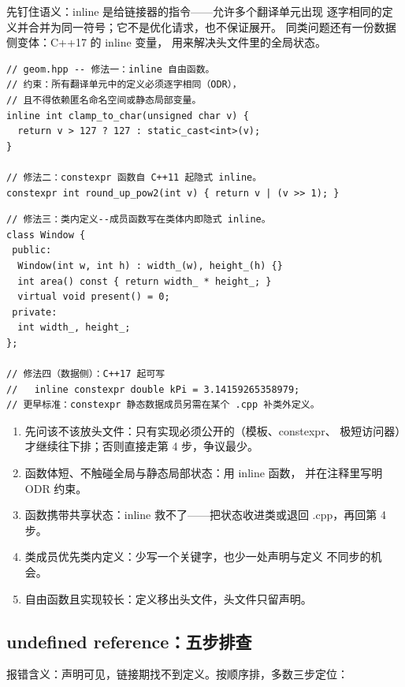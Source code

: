\documentclass[12pt,a4paper,fontset=fandol]{ctexbook}
\newcommand{\cpp}[1]{C++#1}
\begin{document}
先钉住语义：inline 是给链接器的指令——允许多个翻译单元出现
逐字相同的定义并合并为同一符号；它不是优化请求，也不保证展开。
同类问题还有一份数据侧变体：\cpp{17} 的 inline 变量，
用来解决头文件里的全局状态。

\begin{lstlisting}[style=cppstyle]
// geom.hpp -- 修法一：inline 自由函数。
// 约束：所有翻译单元中的定义必须逐字相同（ODR），
// 且不得依赖匿名命名空间或静态局部变量。
inline int clamp_to_char(unsigned char v) {
  return v > 127 ? 127 : static_cast<int>(v);
}

// 修法二：constexpr 函数自 C++11 起隐式 inline。
constexpr int round_up_pow2(int v) { return v | (v >> 1); }
\end{lstlisting}

\begin{lstlisting}[style=cppstyle]
// 修法三：类内定义--成员函数写在类体内即隐式 inline。
class Window {
 public:
  Window(int w, int h) : width_(w), height_(h) {}
  int area() const { return width_ * height_; }
  virtual void present() = 0;
 private:
  int width_, height_;
};

// 修法四（数据侧）：C++17 起可写
//   inline constexpr double kPi = 3.14159265358979;
// 更早标准：constexpr 静态数据成员另需在某个 .cpp 补类外定义。
\end{lstlisting}

\begin{guideline}[title={四种修法的决策顺序}]
\begin{enumerate}
\item 先问该不该放头文件：只有实现必须公开的（模板、constexpr、
      极短访问器）才继续往下排；否则直接走第 4 步，争议最少。
\item 函数体短、不触碰全局与静态局部状态：用 inline 函数，
      并在注释里写明 ODR 约束。
\item 函数携带共享状态：inline 救不了——把状态收进类或退回
      .cpp，再回第 4 步。
\item 类成员优先类内定义：少写一个关键字，也少一处声明与定义
      不同步的机会。
\item 自由函数且实现较长：定义移出头文件，头文件只留声明。
\end{enumerate}
\end{guideline}

\subsection{undefined reference：五步排查}

报错含义：声明可见，链接期找不到定义。按顺序排，多数三步定位：
\end{document}

